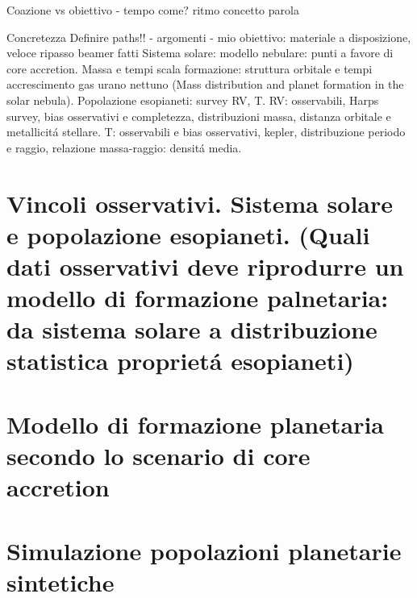\documentclass[10pt,xcolor={usenames},fleqn,serif]{beamer}
\begin{document}
\begin{wordonframe}{Coazione vs obiettivo - tempo come?}
ritmo concetto parola
\end{wordonframe}

\begin{wordonframe}{Concretezza}
Definire paths!! - argomenti - mio obiettivo: materiale a disposizione, veloce ripasso beamer fatti
Sistema solare: modello nebulare: punti a favore di core accretion. Massa e tempi scala formazione: struttura orbitale  e tempi accrescimento gas urano nettuno (Mass distribution and planet formation in the solar nebula).
Popolazione esopianeti: survey RV, T. RV: osservabili, Harps survey, bias osservativi e completezza, distribuzioni massa, distanza orbitale e metallicit\'a stellare. T: osservabili e bias osservativi, kepler, distribuzione periodo e raggio, relazione massa-raggio: densit\'a media.
\end{wordonframe}

\part{Vincoli osservativi. Sistema solare e popolazione esopianeti. (Quali dati osservativi deve riprodurre un modello di formazione palnetaria: da sistema solare a distribuzione statistica propriet\'a esopianeti)}


\part{Modello di formazione planetaria secondo lo scenario di core accretion}


\part{Simulazione popolazioni planetarie sintetiche}

\end{document}
